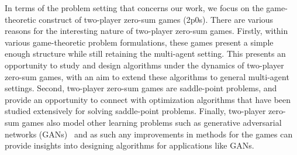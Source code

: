 In terms of the problem setting that concerns our work, we focus on the game-theoretic construct of
two-player zero-sum games (2p0s).
There are various reasons for the interesting nature of two-player zero-sum games.
Firstly, within various game-theoretic problem formulations, these games present a simple enough
structure while still retaining the multi-agent setting.
This presents an opportunity to study and design algorithms under the dynamics of two-player
zero-sum games, with an aim to extend these algorithms to general multi-agent settings.
Second, two-player zero-sum games are saddle-point problems, and provide an opportunity to connect
with optimization algorithms that have been studied extensively for solving saddle-point problems.
Finally, two-player zero-sum games also model other learning problems such as generative
adversarial networks (GANs)~\cite{goodfellowGenerative2014} and as such any improvements in methods
for the games can provide insights into designing algorithms for applications like GANs.

